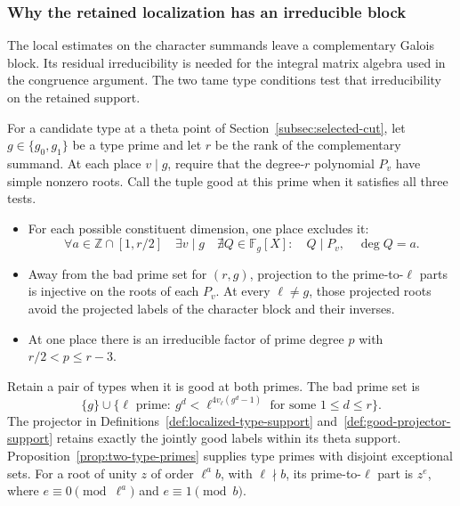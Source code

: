 \subsubsection*{Why the retained localization has an irreducible block}
\label{subsec:retained-galois}
\hypertarget{source-retained-galois}{}

The local estimates on the character summands leave a complementary Galois block. Its residual irreducibility is needed for the integral matrix algebra used in the congruence argument. The two tame type conditions test that irreducibility on the retained support.

\begin{paramdefinition}\label{hyp:retained-type-tests}
For a candidate type at a theta point of Section~\ref{subsec:selected-cut}, let \(g\in\{g_0,g_1\}\) be a type prime and let \(r\) be
the rank of the complementary summand. At each place \(v\mid g\), require that the degree-\(r\) polynomial \(P_v\) have simple nonzero roots. Call the tuple good at this prime when it satisfies all three tests.
\begin{itemize}
\item For each possible constituent dimension, one place excludes it:
\[
 \forall a\in\mathbb Z\cap[1,r/2]\quad\exists v\mid g
 \quad\nexists Q\in\mathbb F_g[X]:\quad Q\mid P_v,\quad \deg Q=a .
\]
\item Away from the bad prime set for \((r,g)\), projection to the
prime-to-\(\ell\) parts is injective on the roots of each \(P_v\).
At every \(\ell\ne g\), those projected roots avoid the projected
labels of the character block and their inverses.
\item At one place there is an irreducible factor of prime degree
\(p\) with \(r/2<p\le r-3\).
\end{itemize}
Retain a pair of types when it is good at both primes. The bad prime set is
\[
 \{g\}\cup\{\ell\text{ prime}:\ g^d<\ell^{4v_\ell(g^d-1)}
                    \text{ for some }1\le d\le r\}.
\]
The projector in Definitions~\ref{def:localized-type-support} and~\ref{def:good-projector-support} retains exactly the jointly good labels within its theta support. Proposition~\ref{prop:two-type-primes} supplies type primes with disjoint exceptional sets. For a root of unity \(z\) of order
\(\ell^a b\), with \(\ell\nmid b\), its prime-to-\(\ell\) part
is \(z^e\), where \(e\equiv0\pmod {\ell^a}\) and
\(e\equiv1\pmod b\).  \label{cor:retained-galois-1}
\end{paramdefinition}

